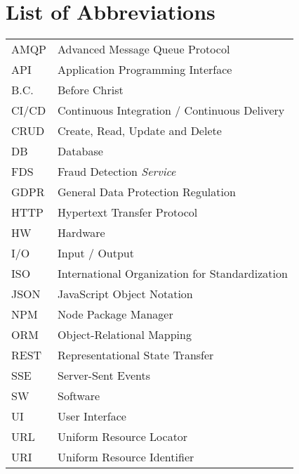 
\chapter{List of Abbreviations}

\begin{tabularx}{\linewidth}{p{} p{}}
  AMQP & Advanced Message Queue Protocol \\ 
  API & Application Programming Interface \\ 
  B.C. & Before Christ \\ 
  CI/CD & Continuous Integration / Continuous Delivery \\ 
  CRUD & Create, Read, Update and Delete \\
  DB & Database \\
  FDS & Fraud Detection \emph{Service} \\ 
  GDPR & General Data Protection Regulation \\
  HTTP & Hypertext Transfer Protocol \\ 
  HW & Hardware \\ 
  I/O & Input / Output \\
  ISO & International Organization for Standardization \\
  JSON & JavaScript Object Notation \\ 
  NPM & Node Package Manager \\
  ORM & Object-Relational Mapping \\ 
  REST & Representational State Transfer \\ 
  SSE & Server-Sent Events \\ 
  SW & Software \\ 
  UI & User Interface \\ 
  URL & Uniform Resource Locator \\ 
  URI & Uniform Resource Identifier \\ 
\end{tabularx}